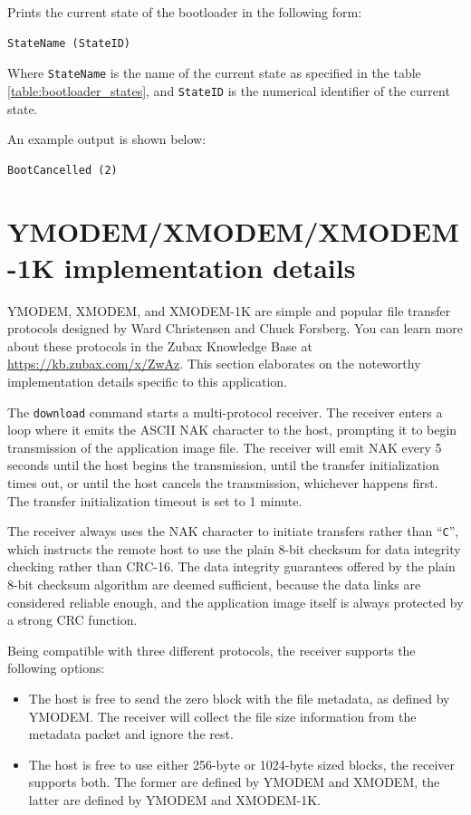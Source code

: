 \documentclass{zubaxdoc}
\begin{document}
Prints the current state of the bootloader in the following form:
\begin{verbatim}
StateName (StateID)
\end{verbatim}
Where \verb|StateName| is the name of the current state as specified in the table \ref{table:bootloader_states},
and \verb|StateID| is the numerical identifier of the current state.

An example output is shown below:
\begin{verbatim}
BootCancelled (2)
\end{verbatim}

\section{YMODEM/XMODEM/XMODEM-1K implementation details}\label{sec:bootloader_ymodem_implementation}

YMODEM, XMODEM, and XMODEM-1K are simple and popular file transfer protocols designed by
Ward Christensen and Chuck Forsberg.
You can learn more about these protocols in the Zubax Knowledge Base at \url{https://kb.zubax.com/x/ZwAz}.
This section elaborates on the noteworthy implementation details specific to this application.

The \verb|download| command starts a multi-protocol receiver.
The receiver enters a loop where it emits the ASCII NAK character to the host,
prompting it to begin transmission of the application image file.
The receiver will emit NAK every 5 seconds until the host begins the transmission,
until the transfer initialization times out,
or until the host cancels the transmission, whichever happens first.
The transfer initialization timeout is set to 1 minute.

The receiver always uses the NAK character to initiate transfers rather than ``\verb|C|'',
which instructs the remote host to use the plain 8-bit checksum for data integrity checking
rather than CRC-16.
The data integrity guarantees offered by the plain 8-bit checksum algorithm are deemed sufficient,
because the data links are considered reliable enough,
and the application image itself is always protected by a strong CRC function.

Being compatible with three different protocols, the receiver supports the following options:
\begin{itemize}
    \item The host is free to send the zero block with the file metadata, as defined by YMODEM.
          The receiver will collect the file size information from the metadata packet and ignore the rest.

    \item The host is free to use either 256-byte or 1024-byte sized blocks, the receiver supports both.
          The former are defined by YMODEM and XMODEM, the latter are defined by YMODEM and XMODEM-1K.
\end{itemize}
\end{document}
